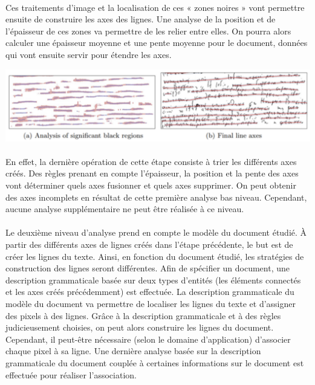 \paragraph{}
Ces traitements d'image et la localisation de ces « zones noires » vont permettre ensuite de construire les axes des lignes.
Une analyse de la position et de l'épaisseur de ces zones va permettre de les relier entre elles. On pourra alors calculer
une épaisseur moyenne et une pente moyenne pour le document, données qui vont ensuite servir pour étendre les axes.

\begin{mdframed}[frametitle={Figure 13 : Extension des axes correspondant aux lignes de texte}, innerbottommargin=10]
\begin{center}
\includegraphics[width=0.6\linewidth]{detect3.png}
\end{center}
\end{mdframed}

\paragraph{}
En effet, la dernière opération de cette étape consiste à trier les différents axes créés. Des règles prenant en compte l'épaisseur,
la position et la pente des axes vont déterminer quels axes fusionner et quels axes supprimer. On peut obtenir des axes incomplets
en résultat de cette première analyse bas niveau. Cependant, aucune analyse supplémentaire ne peut être réalisée à ce niveau.

\paragraph{}
Le deuxième niveau d'analyse prend en compte le modèle du document étudié. À partir des différents axes de lignes créés dans l'étape
précédente, le but est de créer les lignes du texte. Ainsi, en fonction du document étudié, les stratégies de construction des lignes
seront différentes. Afin de spécifier un document, une description grammaticale basée sur deux types d'entités (les éléments connectés
et les axes créés précédemment) est effectuée. La description grammaticale du modèle du document va permettre de localiser les lignes
du texte et d'assigner des pixels à des lignes. Grâce à la description grammaticale et à des règles judicieusement choisies, on peut alors
construire les lignes du document. Cependant, il peut-être nécessaire (selon le domaine d'application) d'associer chaque pixel à sa ligne.
Une dernière analyse basée sur la description grammaticale du document couplée à certaines informations sur le document
est effectuée pour réaliser l'association.

